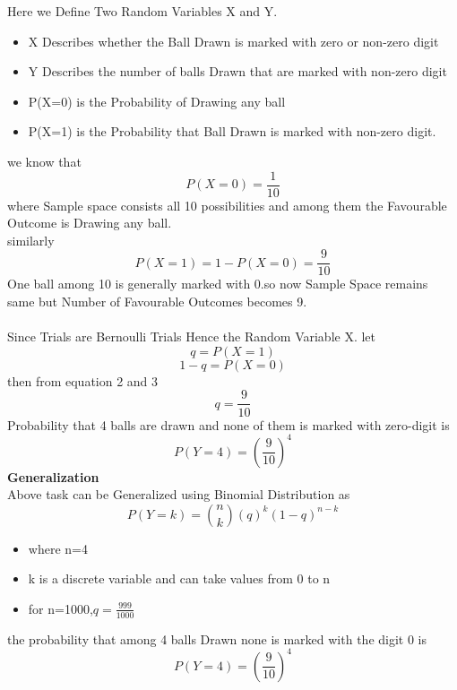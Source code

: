 Here we Define Two Random Variables X and Y. \\
\begin{itemize}
    \item X Describes whether the Ball Drawn is marked with zero or non-zero digit\\
    \item Y Describes the number of balls Drawn that are marked with non-zero digit \\
    \item P(X=0) is the Probability of Drawing any ball \\
    \item  P(X=1) is the Probability that Ball Drawn is marked with non-zero digit.\\
\end{itemize}
we know that
\begin{equation}
    P(X=0)=\frac{1}{10}
\end{equation}
where Sample space consists all 10 possibilities and among  them the Favourable Outcome is Drawing any ball.\\
similarly
\begin{equation}
    P(X=1)=1-P(X=0)=\frac{9}{10}
\end{equation}
One ball among 10 is generally marked with 0.so now Sample Space remains same but Number of Favourable Outcomes becomes 9.\\  \\
Since Trials are  Bernoulli Trials Hence the Random Variable X.
let
\begin{equation}
    q=P(X=1)
\end{equation}
\begin{equation}
    1-q=P(X=0)
\end{equation}
then from equation 2 and 3 
\begin{equation}
    q=\frac{9}{10}
\end{equation}
Probability that 4 balls are drawn and none of them is marked with zero-digit is 
\begin{equation}
    P(Y=4)=\left(\frac{9}{10}\right)^4
\end{equation}
\textbf{Generalization}\\
Above task can be Generalized using Binomial Distribution as
\begin{equation}
    P(Y=k)=\binom{n}{k}(q)^k(1-q)^{n-k}
\end{equation}
\begin{itemize}
    \item where n=4
    \item k is a  discrete variable and can take values from 0 to n
    \item for n=1000,$q=\frac{999}{1000}$
\end{itemize}
%
the probability that among 4 balls Drawn  none is marked with the digit 0 is
\begin{equation}
    P(Y=4)=\left(\frac{9}{10}\right)^4
\end{equation}